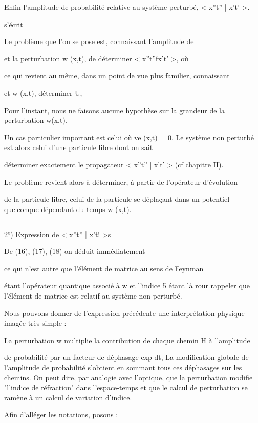 Enfin l'amplitude de probabilité relative au système perturbé, < x''t'' | x't' >.

s'écrit

Le problème que l'on se pose est, connaissant l'amplitude de

et la perturbation w (x,t), de déterminer < x''t''fx't' >, où

ce qui revient au même, dans un point de vue plus familier, connaissant

et w (x,t), déterminer U,

Pour l'instant, nous ne faisons aucune hypothèse sur la
grandeur de la perturbation w(x,t).

Un cas particulier important est celui où ve (x,t) = 0.
Le système non perturbé est alors celui d'une particule libre dont on sait

déterminer exactement le propagateur < x''t'' | x't' > (cf chapitre II).

Le problème revient alors à déterminer, à partir de l'opérateur d'évolution

de la particule libre, celui de la particule se déplaçant dans un potentiel
quelconque dépendant du temps w (x,t).

\subsection{}
2°) Expression de < x''t'' | x't! >s

De (16), (17), (18) on déduit immédiatement

ce qui n'est autre que l'élément de matrice au sens de Feynman

 étant l'opérateur quantique associé à w et l'indice 5 étant là
rour rappeler que l'élément de matrice est relatif au système non perturbé.

Nous pouvons donner de l'expression précédente une interprétation physique imagée très simple :

La perturbation w multiplie la contribution de chaque chemin H à l'amplitude

de probabilité par un facteur de déphasage exp dt, La
modification globale de l'amplitude de probabilité s'obtient en sommant
tous ces déphasages sur les chemins. On peut dire, par analogie avec l'optique,
que la perturbation modifie "l'indice de réfraction" dans l'espace-temps et
que le calcul de perturbation se ramène à un calcul de variation d'indice.

Afin d'alléger les notations, posons :

